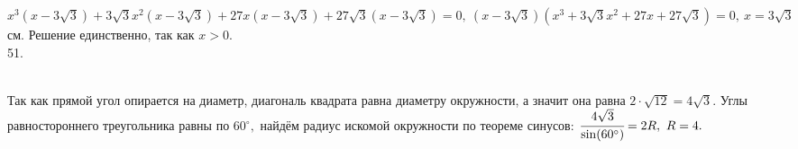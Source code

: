 \documentclass[12pt]{article}
\begin{document}
$x^3(x-3\sqrt{3})+3\sqrt{3}x^2(x-3\sqrt{3})+27x(x-3\sqrt{3})+27\sqrt{3}(x-3\sqrt{3})=0,\ (x-3\sqrt{3})(x^3+3\sqrt{3}x^2+27x+27\sqrt{3})=0,\ x=3\sqrt{3}$см. Решение единственно, так как $x>0.$\\
51. \begin{figure}[ht!]
\end{figure}\\
Так как прямой угол опирается на диаметр, диагональ квадрата равна диаметру окружности, а значит она равна $2\cdot\sqrt{12}=4\sqrt{3}.$ Углы равностороннего треугольника равны по $60^\circ,$ найдём радиус искомой окружности по теореме синусов: $\cfrac{4\sqrt{3}}{\sin(60^\circ)}=2R,\ R=4.$\newpage\noindent
\end{document}

